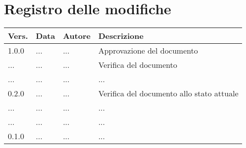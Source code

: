 \section*{Registro delle modifiche}

\begin{table}[h]
    \centering
    \begin{tabular}{|l|l|p{3cm}|p{5cm}|}
        \hline
        \rowcolor[gray]{0.9}
        \textbf{Vers.} & \textbf{Data} & \textbf{Autore} & \textbf{Descrizione}\\
        \hline
        1.0.0 & ... & ... & Approvazione del documento\\
        \hline
        ... & ... & ... & Verifica del documento\\
        \hline
        ... & ... & ... & ...\\
        \hline
        0.2.0 & ... & ... & Verifica del documento allo stato attuale\\
        \hline
        ... & ... & ... & ...\\
        \hline
        ... & ... & ... & ...\\
        \hline
        0.1.0 & ... & ... & ...\\
        \hline
    \end{tabular}
\end{table}
